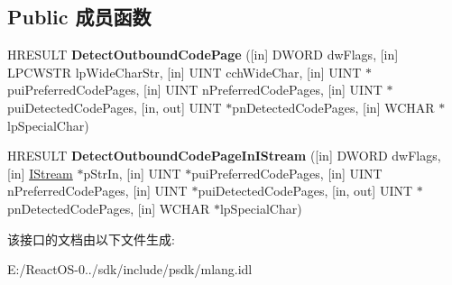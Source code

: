 \subsection*{Public 成员函数}
\begin{DoxyCompactItemize}
\item 
\mbox{\label{interface_multi_language_1_1_i_multi_language3_adb680d5648f01c96a3cc5b581a2061a3}} 
H\+R\+E\+S\+U\+LT {\bfseries Detect\+Outbound\+Code\+Page} (\mbox{[}in\mbox{]} D\+W\+O\+RD dw\+Flags, \mbox{[}in\mbox{]} L\+P\+C\+W\+S\+TR lp\+Wide\+Char\+Str, \mbox{[}in\mbox{]} U\+I\+NT cch\+Wide\+Char, \mbox{[}in\mbox{]} U\+I\+NT $\ast$pui\+Preferred\+Code\+Pages, \mbox{[}in\mbox{]} U\+I\+NT n\+Preferred\+Code\+Pages, \mbox{[}in\mbox{]} U\+I\+NT $\ast$pui\+Detected\+Code\+Pages, \mbox{[}in, out\mbox{]} U\+I\+NT $\ast$pn\+Detected\+Code\+Pages, \mbox{[}in\mbox{]} W\+C\+H\+AR $\ast$lp\+Special\+Char)
\item 
\mbox{\label{interface_multi_language_1_1_i_multi_language3_ae4b11b665cc8ce2de1572b48fa75f5e3}} 
H\+R\+E\+S\+U\+LT {\bfseries Detect\+Outbound\+Code\+Page\+In\+I\+Stream} (\mbox{[}in\mbox{]} D\+W\+O\+RD dw\+Flags, \mbox{[}in\mbox{]} \hyperlink{interface_i_stream}{I\+Stream} $\ast$p\+Str\+In, \mbox{[}in\mbox{]} U\+I\+NT $\ast$pui\+Preferred\+Code\+Pages, \mbox{[}in\mbox{]} U\+I\+NT n\+Preferred\+Code\+Pages, \mbox{[}in\mbox{]} U\+I\+NT $\ast$pui\+Detected\+Code\+Pages, \mbox{[}in, out\mbox{]} U\+I\+NT $\ast$pn\+Detected\+Code\+Pages, \mbox{[}in\mbox{]} W\+C\+H\+AR $\ast$lp\+Special\+Char)
\end{DoxyCompactItemize}


该接口的文档由以下文件生成\+:\begin{DoxyCompactItemize}
\item 
E\+:/\+React\+O\+S-\/0../sdk/include/psdk/mlang.\+idl\end{DoxyCompactItemize}
